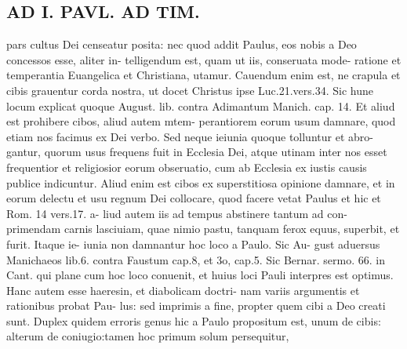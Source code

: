 \documentclass{article}
\begin{document}
\begin{pages}
\section*{AD I. PAVL. AD TIM. }
\marginpar{[ p.180 ]}pars cultus Dei censeatur posita: nec quod addit Paulus, eos nobis a Deo concessos esse, aliter in- telligendum est, quam ut iis, conseruata mode- ratione et temperantia Euangelica et Christiana, utamur. Cauendum enim est, ne crapula et cibis grauentur corda nostra, ut docet Christus ipse Luc.21.vers.34. Sic hune locum explicat quoque August. lib. contra Adimantum Manich. cap. 14. Et aliud est prohibere cibos, aliud autem mtem- perantiorem eorum usum damnare, quod etiam nos facimus ex Dei verbo. Sed neque ieiunia quoque tolluntur et abro- gantur, quorum usus frequens fuit in Ecclesia Dei, atque utinam inter nos esset frequentior et religiosior eorum obseruatio, cum ab Ecclesia ex iustis causis publice indicuntur. Aliud enim est cibos ex superstitiosa opinione damnare, et in eorum delectu et usu regnum Dei collocare, quod facere vetat Paulus et hic et Rom. 14 vers.17. a- liud autem iis ad tempus abstinere tantum ad con- primendam carnis lasciuiam, quae nimio pastu, tanquam ferox equus, superbit, et furit. Itaque ie- iunia non damnantur hoc loco a Paulo. Sic Au- gust aduersus Manichaeos lib.6. contra Faustum cap.8, et 3o, cap.5. Sic Bernar. sermo. 66. in Cant. qui plane cum hoc loco conuenit, et huius loci Pauli interpres est optimus. Hanc autem esse haeresin, et diabolicam doctri- nam variis argumentis et rationibus probat Pau- lus: sed imprimis a fine, propter quem cibi a Deo creati sunt. Duplex quidem erroris genus hic a Paulo propositum est, unum de cibis: alterum de coniugio:tamen hoc primum solum persequitur, 

\end{pages}
\end{document}
